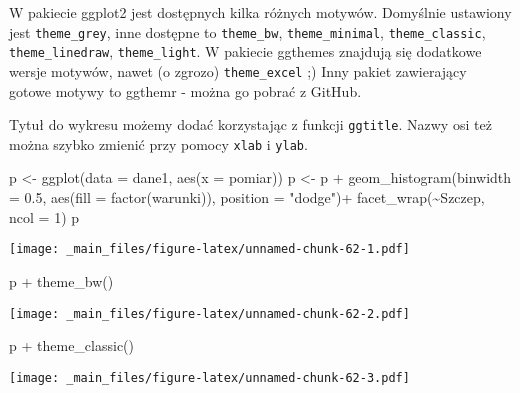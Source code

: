 \documentclass[
]{book}
\newenvironment{Shaded}{\begin{snugshade}}{\end{snugshade}}
\newcommand{\AttributeTok}[1]{\textcolor[rgb]{0.77,0.63,0.00}{#1}}
\newcommand{\DecValTok}[1]{\textcolor[rgb]{0.00,0.00,0.81}{#1}}
\newcommand{\FloatTok}[1]{\textcolor[rgb]{0.00,0.00,0.81}{#1}}
\newcommand{\FunctionTok}[1]{\textcolor[rgb]{0.00,0.00,0.00}{#1}}
\newcommand{\NormalTok}[1]{#1}
\newcommand{\OtherTok}[1]{\textcolor[rgb]{0.56,0.35,0.01}{#1}}
\newcommand{\SpecialCharTok}[1]{\textcolor[rgb]{0.00,0.00,0.00}{#1}}
\newcommand{\StringTok}[1]{\textcolor[rgb]{0.31,0.60,0.02}{#1}}
\begin{document}
W pakiecie ggplot2 jest dostępnych kilka różnych motywów. Domyślnie ustawiony jest \texttt{theme\_grey}, inne dostępne to \texttt{theme\_bw}, \texttt{theme\_minimal}, \texttt{theme\_classic}, \texttt{theme\_linedraw}, \texttt{theme\_light}. W pakiecie ggthemes znajdują się dodatkowe wersje motywów, nawet (o zgrozo) \texttt{theme\_excel} ;) Inny pakiet zawierający gotowe motywy to ggthemr - można go pobrać z GitHub.

Tytuł do wykresu możemy dodać korzystając z funkcji \texttt{ggtitle}. Nazwy osi też można szybko zmienić przy pomocy \texttt{xlab} i \texttt{ylab}.

\begin{Shaded}
\begin{Highlighting}[]
\NormalTok{p }\OtherTok{\textless{}{-}} \FunctionTok{ggplot}\NormalTok{(}\AttributeTok{data =}\NormalTok{ dane1, }\FunctionTok{aes}\NormalTok{(}\AttributeTok{x =}\NormalTok{ pomiar))}
\NormalTok{p }\OtherTok{\textless{}{-}}\NormalTok{ p }\SpecialCharTok{+} \FunctionTok{geom\_histogram}\NormalTok{(}\AttributeTok{binwidth =} \FloatTok{0.5}\NormalTok{, }\FunctionTok{aes}\NormalTok{(}\AttributeTok{fill =} \FunctionTok{factor}\NormalTok{(warunki)), }\AttributeTok{position =} \StringTok{"dodge"}\NormalTok{)}\SpecialCharTok{+}
  \FunctionTok{facet\_wrap}\NormalTok{(}\SpecialCharTok{\textasciitilde{}}\NormalTok{Szczep, }\AttributeTok{ncol =} \DecValTok{1}\NormalTok{)}
\NormalTok{p}
\end{Highlighting}
\end{Shaded}

\texttt{[image: \_main\_files/figure-latex/unnamed-chunk-62-1.pdf]}

\begin{Shaded}
\begin{Highlighting}[]
\NormalTok{p }\SpecialCharTok{+} \FunctionTok{theme\_bw}\NormalTok{()}
\end{Highlighting}
\end{Shaded}

\texttt{[image: \_main\_files/figure-latex/unnamed-chunk-62-2.pdf]}

\begin{Shaded}
\begin{Highlighting}[]
\NormalTok{p }\SpecialCharTok{+} \FunctionTok{theme\_classic}\NormalTok{()}
\end{Highlighting}
\end{Shaded}

\texttt{[image: \_main\_files/figure-latex/unnamed-chunk-62-3.pdf]}
\end{document}
